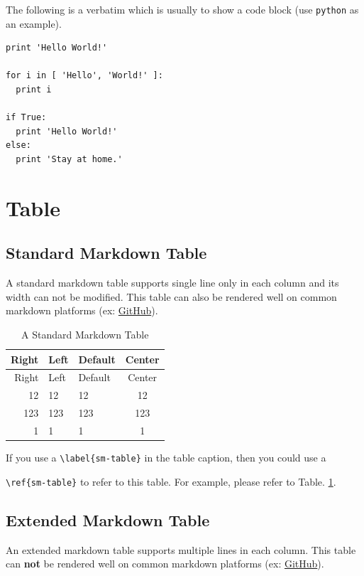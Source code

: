 \documentclass[10pt, a4paper, oneside]{book}
\begin{document}
The following is a verbatim which is usually to show a code block (use \texttt{python} as an example).

\begin{verbatim}
print 'Hello World!'

for i in [ 'Hello', 'World!' ]:
  print i

if True:
  print 'Hello World!'
else:
  print 'Stay at home.'
\end{verbatim}

\clearpage

\section{Table}\label{table}

\subsection{Standard Markdown Table}\label{standard-markdown-table}

A standard markdown table supports single line only in each column and its width can not be modified.
This table can also be rendered well on common markdown platforms (ex: \href{https://github.com/}{GitHub}).

\begin{longtable}[c]{@{}rllc@{}}
\caption{A Standard Markdown Table \label{sm-table}}\tabularnewline
\toprule
Right & Left & Default & Center\tabularnewline
\midrule
\endfirsthead
\toprule
Right & Left & Default & Center\tabularnewline
\midrule
\endhead
12 & 12 & 12 & 12\tabularnewline
123 & 123 & 123 & 123\tabularnewline
1 & 1 & 1 & 1\tabularnewline
\bottomrule
\end{longtable}

If you use a \texttt{\textbackslash{}label\{sm-table\}} in the table caption, then you could use a

\texttt{\textbackslash{}ref\{sm-table\}} to refer to this table.
For example, please refer to Table. \ref{sm-table}.

\subsection{Extended Markdown Table}\label{extended-markdown-table}

An extended markdown table supports multiple lines in each column.
This table can \textbf{not} be rendered well on common markdown platforms (ex: \href{https://github.com/}{GitHub}).
\end{document}
